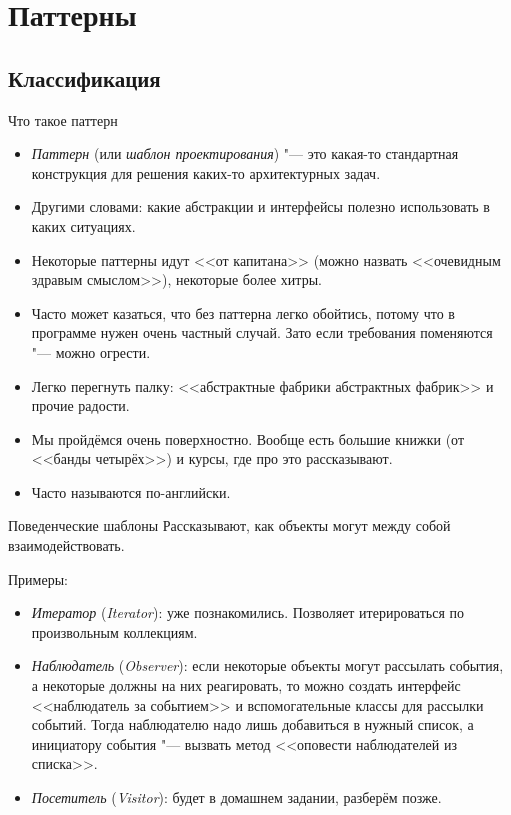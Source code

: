 \section{Паттерны}
\subsection{Классификация}

\begin{frame}
\end{frame}

\begin{frame}{Что такое паттерн}
	\begin{itemize}
		\item
			\textit{Паттерн} (или \textit{шаблон проектирования}) "--- это какая-то стандартная конструкция для решения каких-то архитектурных задач.
		\item
			Другими словами: какие абстракции и интерфейсы полезно использовать в каких ситуациях.
		\item
			Некоторые паттерны идут <<от капитана>> (можно назвать <<очевидным здравым смыслом>>), некоторые более хитры.
		\item
			Часто может казаться, что без паттерна легко обойтись, потому что в программе нужен очень частный случай.
			Зато если требования поменяются "--- можно огрести.
		\item
			Легко перегнуть палку: <<абстрактные фабрики абстрактных фабрик>> и прочие радости.
		\item
			Мы пройдёмся очень поверхностно.
			Вообще есть большие книжки (от <<банды четырёх>>) и курсы, где про это рассказывают.
		\item
			Часто называются по-английски.
	\end{itemize}
\end{frame}

\begin{frame}{Поведенческие шаблоны}
	Рассказывают, как объекты могут между собой взаимодействовать.

	Примеры:
	\begin{itemize}
		\item
			\textit{Итератор} (\textit{Iterator}): уже познакомились.
			Позволяет итерироваться по произвольным коллекциям.
		\item
			\textit{Наблюдатель} (\textit{Observer}): если некоторые объекты могут рассылать события, а некоторые
			должны на них реагировать, то можно создать интерфейс <<наблюдатель за событием>> и вспомогательные классы
			для рассылки событий.
			Тогда наблюдателю надо лишь добавиться в нужный список, а инициатору события "--- вызвать метод <<оповести наблюдателей из списка>>.
		\item
			\textit{Посетитель} (\textit{Visitor}): будет в домашнем задании, разберём позже.
	\end{itemize}
\end{frame}

